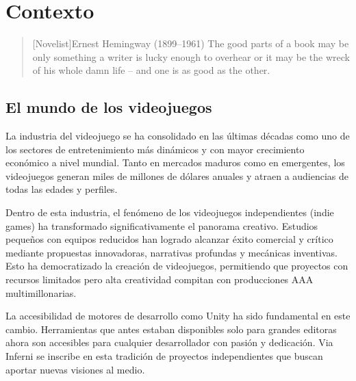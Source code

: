 \chapter{Contexto}

\begin{quotation}[Novelist]{Ernest Hemingway (1899--1961)}
The good parts of a book may be only something a writer is lucky enough to overhear or it may be the wreck of his whole damn life -- and one is as good as the other.
\end{quotation}

\begin{abstract}
En este capítulo se describe el marco contextual del proyecto Via Inferni.
Se analiza la relevancia actual de la industria de los videojuegos,
se profundiza en las características del género roguelike y sus mecánicas clave,
se revisa el estado del arte con títulos de referencia que han marcado la industria,
y finalmente se explora cómo la obra clásica de Dante Alighieri
sirve como inspiración narrativa y artística para este proyecto.
\end{abstract}

\section{El mundo de los videojuegos}

La industria del videojuego se ha consolidado en las últimas décadas
como uno de los sectores de entretenimiento más dinámicos
y con mayor crecimiento económico a nivel mundial.
Tanto en mercados maduros como en emergentes,
los videojuegos generan miles de millones de dólares anuales
y atraen a audiencias de todas las edades y perfiles.

Dentro de esta industria, el fenómeno de los videojuegos independientes (indie games)
ha transformado significativamente el panorama creativo.
Estudios pequeños con equipos reducidos han logrado alcanzar éxito comercial y crítico
mediante propuestas innovadoras, narrativas profundas y mecánicas inventivas.
Esto ha democratizado la creación de videojuegos,
permitiendo que proyectos con recursos limitados pero alta creatividad
compitan con producciones AAA multimillonarias.

La accesibilidad de motores de desarrollo como Unity ha sido fundamental en este cambio.
Herramientas que antes estaban disponibles solo para grandes editoras
ahora son accesibles para cualquier desarrollador con pasión y dedicación.
Via Inferni se inscribe en esta tradición de proyectos independientes
que buscan aportar nuevas visiones al medio.

